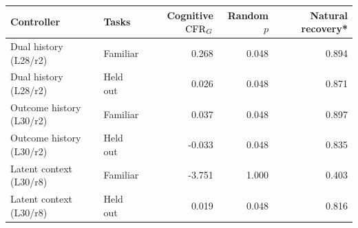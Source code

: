 \begin{tabular}{llrrr}
\toprule
Controller & Tasks & Cognitive $\mathrm{CFR}_{G}$ & Random $p$ & Natural recovery* \\
\midrule
Dual history (L28/r2) & Familiar & 0.268 & 0.048 & 0.894 \\
Dual history (L28/r2) & Held out & 0.026 & 0.048 & 0.871 \\
Outcome history (L30/r2) & Familiar & 0.037 & 0.048 & 0.897 \\
Outcome history (L30/r2) & Held out & -0.033 & 0.048 & 0.835 \\
Latent context (L30/r8) & Familiar & -3.751 & 1.000 & 0.403 \\
Latent context (L30/r8) & Held out & 0.019 & 0.048 & 0.816 \\
\bottomrule
\end{tabular}
